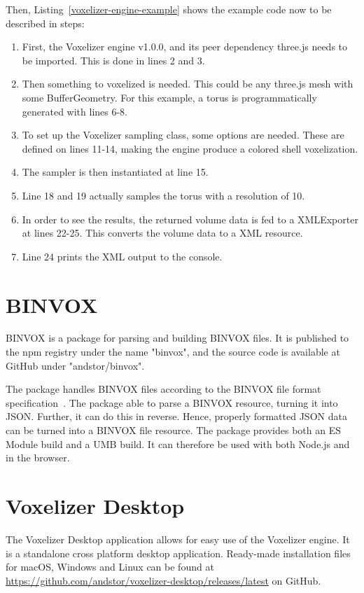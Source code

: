 Then, Listing~\ref{voxelizer-engine-example} shows the example code now to be described in steps: 
\begin{enumerate}
    \item First, the Voxelizer engine v1.0.0, and its peer dependency three.js needs to be imported. This is done in lines 2 and 3.
    \item Then something to voxelized is needed. This could be any three.js mesh with some BufferGeometry. For this example, a torus is programmatically generated with lines 6-8.
    \item To set up the Voxelizer sampling class, some options are needed. These are defined on lines 11-14, making the engine produce a colored shell voxelization.
    \item The sampler is then instantiated at line 15.
    \item Line 18 and 19 actually samples the torus with a resolution of 10.
    \item In order to see the results, the returned volume data is fed to a XMLExporter at lines 22-25. This converts the volume data to a XML resource.
    \item Line 24 prints the XML output to the console.
\end{enumerate}


\section{BINVOX}
BINVOX is a package for parsing and building BINVOX files. It is published to the npm registry under the name "binvox", and the source code is available at GitHub under "andstor/binvox".

The package handles BINVOX files according to the BINVOX file format specification~\cite{binvox-file-format}. The package able to parse a BINVOX resource, turning it into JSON. Further, it can do this in reverse. Hence, properly formatted JSON data can be turned into a BINVOX file resource. The package provides both an ES Module build and a UMB build. It can therefore be used with both Node.js and in the browser.

\section{Voxelizer Desktop}
The Voxelizer Desktop application allows for easy use of the Voxelizer engine. It is a standalone cross platform desktop application. Ready-made installation files for macOS, Windows and Linux can be found at \url{https://github.com/andstor/voxelizer-desktop/releases/latest} on GitHub.

